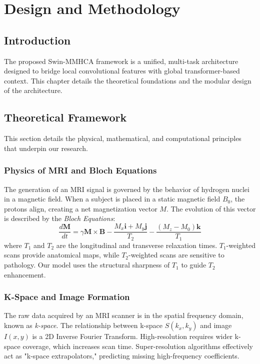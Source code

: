 \chapter{Design and Methodology}

\section{Introduction}
The proposed Swin-MMHCA framework is a unified, multi-task architecture designed to bridge local convolutional features with global transformer-based context. This chapter details the theoretical foundations and the modular design of the architecture.

\section{Theoretical Framework}
This section details the physical, mathematical, and computational principles that underpin our research.

\subsection{Physics of MRI and Bloch Equations}
The generation of an MRI signal is governed by the behavior of hydrogen nuclei in a magnetic field. When a subject is placed in a static magnetic field $B_0$, the protons align, creating a net magnetization vector $M$. The evolution of this vector is described by the \textit{Bloch Equations}:
\begin{equation}
    \frac{d\mathbf{M}}{dt} = \gamma \mathbf{M} \times \mathbf{B} - \frac{M_x \mathbf{i} + M_y \mathbf{j}}{T_2} - \frac{(M_z - M_0) \mathbf{k}}{T_1}
\end{equation}
where $T_1$ and $T_2$ are the longitudinal and transverse relaxation times. $T_1$-weighted scans provide anatomical maps, while $T_2$-weighted scans are sensitive to pathology. Our model uses the structural sharpness of $T_1$ to guide $T_2$ enhancement.

\subsection{K-Space and Image Formation}
The raw data acquired by an MRI scanner is in the spatial frequency domain, known as \textit{k-space}. The relationship between k-space $S(k_x, k_y)$ and image $I(x, y)$ is a 2D Inverse Fourier Transform. High-resolution requires wider k-space coverage, which increases scan time. Super-resolution algorithms effectively act as "k-space extrapolators," predicting missing high-frequency coefficients.

